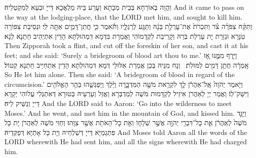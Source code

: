 {{{}}
{וַהֲוָה בְּאוֹרְחָא בְּבֵית מְבָתָא וְעָרַע בֵּיהּ מַלְאֲכָא דַּייָ וּבְעָא לְמִקְטְלֵיהּ׃}
{And it came to pass on the way at the lodging-place, that the LORD met him, and sought to kill him.}{}
{וַתִּקַּ֨ח צִפֹּרָ֜ה צֹ֗ר וַתִּכְרֹת֙ אֶת־עׇרְלַ֣ת בְּנָ֔הּ וַתַּגַּ֖ע לְרַגְלָ֑יו וַתֹּ֕אמֶר כִּ֧י חֲתַן־דָּמִ֛ים אַתָּ֖ה לִֽי׃
}
{וּנְסֵיבַת צִפּוֹרָה טִנָּרָא וּגְזַרַת יָת עָרְלַת בְּרַהּ וְקָרֵיבַת לִקְדָמוֹהִי וַאֲמַרַת בִּדְמָא דִּמְהוּלְתָּא הָדֵין אִתְיְהֵיב חַתְנָא לַנָא׃}
{Then Zipporah took a flint, and cut off the foreskin of her son, and cast it at his feet; and she said: ‘Surely a bridegroom of blood art thou to me.’}{}
{וַיִּ֖רֶף מִמֶּ֑נּוּ אָ֚ז אָֽמְרָ֔ה חֲתַ֥ן דָּמִ֖ים לַמּוּלֹֽת׃ \petucha 
{}}
{וְנָח מִנֵּיהּ בְּכֵן אֲמַרַת אִלּוּלֵי דְּמָא דִּמְהוּלְתָּא הָדֵין אִתְחַיַּיב חַתְנָא קְטוֹל׃}
{So He let him alone. Then she said: ‘A bridegroom of blood in regard of the circumcision.’}{}
{וַיֹּ֤אמֶר יְהֹוָה֙ אֶֽל־אַהֲרֹ֔ן לֵ֛ךְ לִקְרַ֥את מֹשֶׁ֖ה הַמִּדְבָּ֑רָה וַיֵּ֗לֶךְ וַֽיִּפְגְּשֵׁ֛הוּ בְּהַ֥ר הָאֱלֹהִ֖ים וַיִּשַּׁק־לֽוֹ׃}
{וַאֲמַר יְיָ לְאַהֲרֹן אִיזֵיל לְקַדָּמוּת מֹשֶׁה לְמַדְבְּרָא וַאֲזַל וְעָרְעֵיהּ בְּטוּרָא דְּאִתְגְּלִי עֲלוֹהִי יְקָרָא דַּייָ וְנַשֵּׁיק לֵיהּ׃}
{And the LORD said to Aaron: ‘Go into the wilderness to meet Moses.’ And he went, and met him in the mountain of God, and kissed him.}{}
{וַיַּגֵּ֤ד מֹשֶׁה֙ לְאַֽהֲרֹ֔ן אֵ֛ת כׇּל־דִּבְרֵ֥י יְהֹוָ֖ה אֲשֶׁ֣ר שְׁלָח֑וֹ וְאֵ֥ת כׇּל־הָאֹתֹ֖ת אֲשֶׁ֥ר צִוָּֽהוּ׃}
{וְחַוִּי מֹשֶׁה לְאַהֲרֹן יָת כָּל פִּתְגָמַיָּא דַּייָ דְּשַׁלְחֵיהּ וְיָת כָּל אָתַיָּא דְּפַקְּדֵיהּ׃}
{And Moses told Aaron all the words of the LORD wherewith He had sent him, and all the signs wherewith He had charged him.}{}
}
